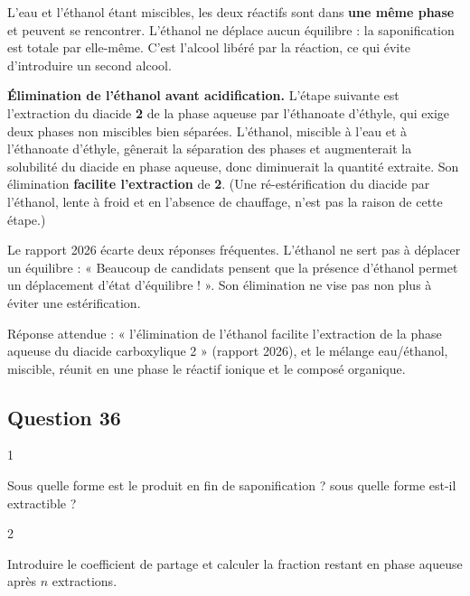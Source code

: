\documentclass[11pt,a4paper]{article}
\begin{document}
L'eau et l'éthanol étant miscibles, les deux réactifs sont dans \textbf{une même phase} et peuvent se rencontrer. L'éthanol ne déplace aucun équilibre : la saponification est totale par elle-même. C'est l'alcool libéré par la réaction, ce qui évite d'introduire un second alcool.

\textbf{Élimination de l'éthanol avant acidification.} L'étape suivante est l'extraction du diacide \textbf{2} de la phase aqueuse par l'éthanoate d'éthyle, qui exige deux phases non miscibles bien séparées. L'éthanol, miscible à l'eau et à l'éthanoate d'éthyle, gênerait la séparation des phases et augmenterait la solubilité du diacide en phase aqueuse, donc diminuerait la quantité extraite. Son élimination \textbf{facilite l'extraction} de \textbf{2}. (Une ré-estérification du diacide par l'éthanol, lente à froid et en l'absence de chauffage, n'est pas la raison de cette étape.)

\begin{piege}

Le rapport 2026 écarte deux réponses fréquentes. L'éthanol ne sert pas à déplacer un équilibre : « Beaucoup de candidats pensent que la présence d'éthanol permet un déplacement d'état d'équilibre ! ». Son élimination ne vise pas non plus à éviter une estérification.

\end{piege}

\begin{jury}

Réponse attendue : « l'élimination de l'éthanol facilite l'extraction de la phase aqueuse du diacide carboxylique 2 » (rapport 2026), et le mélange eau/éthanol, miscible, réunit en une phase le réactif ionique et le composé organique.

\end{jury}

\hypertarget{question-36}{%
\subsection{Question 36}\label{question-36}}

\begin{indication}{1}

Sous quelle forme est le produit en fin de saponification ? sous quelle forme est-il extractible ?

\end{indication}

\begin{indication}{2}

Introduire le coefficient de partage et calculer la fraction restant en phase aqueuse après \(n\) extractions.

\end{indication}
\end{document}
